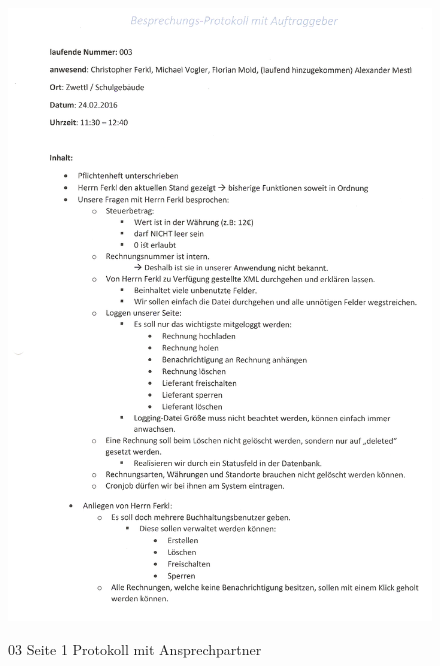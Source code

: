 \begin{figure}[!h]
    \centering
    \includegraphics[width=16cm]{figures/Ferkl_03_1.png}
    \label{fig:03_Seite 1_Protokoll_Ansprechpartner}
    \caption{03 Seite 1 Protokoll mit Ansprechpartner}
\end{figure}